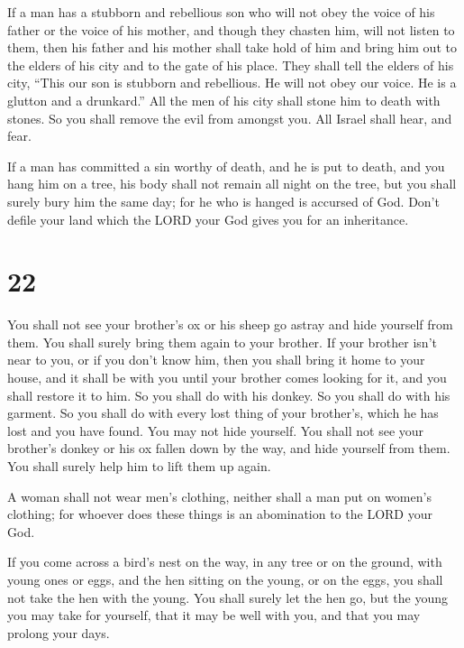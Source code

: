  If a man has a stubborn and rebellious son who will not
obey the voice of his father or the voice of his mother, and though they
chasten him, will not listen to them,  then his father
and his mother shall take hold of him and bring him out to the elders of
his city and to the gate of his place.  They shall tell
the elders of his city, ``This our son is stubborn and rebellious. He
will not obey our voice. He is a glutton and a drunkard.''
 All the men of his city shall stone him to death with
stones. So you shall remove the evil from amongst you. All Israel shall
hear, and fear.

 If a man has committed a sin worthy of death, and he is
put to death, and you hang him on a tree,  his body shall
not remain all night on the tree, but you shall surely bury him the same
day; for he who is hanged is accursed of God. Don't defile your land
which the LORD your God gives you for an inheritance.

\hypertarget{section-21}{%
\section{22}\label{section-21}}

 You shall not see your brother's ox or his sheep go
astray and hide yourself from them. You shall surely bring them again to
your brother.  If your brother isn't near to you, or if
you don't know him, then you shall bring it home to your house, and it
shall be with you until your brother comes looking for it, and you shall
restore it to him.  So you shall do with his donkey. So
you shall do with his garment. So you shall do with every lost thing of
your brother's, which he has lost and you have found. You may not hide
yourself.  You shall not see your brother's donkey or his
ox fallen down by the way, and hide yourself from them. You shall surely
help him to lift them up again.

 A woman shall not wear men's clothing, neither shall a
man put on women's clothing; for whoever does these things is an
abomination to the LORD your God.

 If you come across a bird's nest on the way, in any tree
or on the ground, with young ones or eggs, and the hen sitting on the
young, or on the eggs, you shall not take the hen with the young.
 You shall surely let the hen go, but the young you may
take for yourself, that it may be well with you, and that you may
prolong your days.

